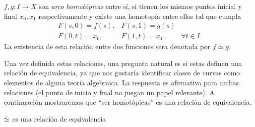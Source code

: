 \begin{definicion} \label{def:arco-homotopia}
  \(f,g : I \to X\) son \emph{arco homotópicas} entre sí, si tienen los mismos
  puntos inicial y final \(x_0, x_1\) respectivamente y existe una homotopía entre
  ellos tal que cumpla
  \[
    \begin{matrix}
      F(s,0) = f(s), & F(s,1) = g(s) & ~ \\
      F(0,t) = x_0,  & F(1,t) = x_1, & \forall t \in I
    \end{matrix}
  \]
  La existencia de esta relación entre dos funciones sera denotada por
  \(f \simeq g\).
\end{definicion}
Una vez definida estas relaciones, una pregunta natural es si estas definen
una relación de equivalencia, ya que nos gustaría identificar clases de
curvas como elementos de alguna teoría algebraica. La respuesta es
afirmativa para ambas relaciones (el punto de inicio y final no juegan
un papel relevante). A continuación mostraremos que ``ser homotópicas''
es una relación de equivalencia.
\begin{teorema}
  \(\stackrel{.}{\simeq}\) es una relación de equivalencia
\end{teorema}
